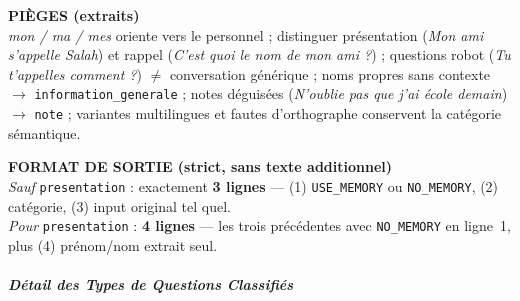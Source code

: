 \documentclass[a4paper,12pt]{report}
\begin{document}
\begin{tcolorbox}
		\vspace{0.35em}
		\textbf{PIÈGES (extraits)} \\
		\textit{mon / ma / mes} oriente vers le personnel ; distinguer présentation
		(\textit{Mon ami s'appelle Salah}) et rappel (\textit{C'est quoi le nom de mon
			ami ?}) ; questions robot (\textit{Tu t'appelles comment ?}) $\neq$
		conversation générique ; noms propres sans contexte $\rightarrow$
		\texttt{information\_generale} ; notes déguisées (\textit{N'oublie pas que j'ai
			école demain}) $\rightarrow$ \texttt{note} ; variantes multilingues et fautes
		d'orthographe conservent la catégorie sémantique.
		
		\vspace{0.35em}
		\textbf{FORMAT DE SORTIE (strict, sans texte additionnel)} \\
		\textit{Sauf} \texttt{presentation} : exactement \textbf{3 lignes} — (1)
		\texttt{USE\_MEMORY} ou \texttt{NO\_MEMORY}, (2) catégorie, (3) input original
		tel quel. \\
		\textit{Pour} \texttt{presentation} : \textbf{4 lignes} — les trois précédentes
		avec \texttt{NO\_MEMORY} en ligne~1, plus (4) prénom/nom extrait seul.
		
	\end{tcolorbox}
	
	\vspace{0.8em}
	\subparagraph{Détail des Types de Questions Classifiés}
	
	\vspace{0.3em}
	
\end{document}

